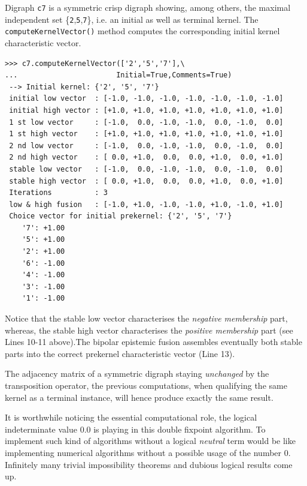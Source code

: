 Digraph \texttt{c7} is a symmetric crisp digraph showing, among others, the maximal independent set \{\texttt{2},\texttt{5},\texttt{7}\}, i.e. an initial as well as terminal kernel. The \texttt{computeKernelVector()} method computes the corresponding initial kernel characteristic vector.
\begin{lstlisting}[basicstyle=\ttfamily\scriptsize]
>>> c7.computeKernelVector(['2','5','7'],\
...                       Initial=True,Comments=True)
 --> Initial kernel: {'2', '5', '7'}
 initial low vector  : [-1.0, -1.0, -1.0, -1.0, -1.0, -1.0, -1.0]
 initial high vector : [+1.0, +1.0, +1.0, +1.0, +1.0, +1.0, +1.0]
 1 st low vector     : [-1.0,  0.0, -1.0, -1.0,  0.0, -1.0,  0.0]
 1 st high vector    : [+1.0, +1.0, +1.0, +1.0, +1.0, +1.0, +1.0]
 2 nd low vector     : [-1.0,  0.0, -1.0, -1.0,  0.0, -1.0,  0.0]
 2 nd high vector    : [ 0.0, +1.0,  0.0,  0.0, +1.0,  0.0, +1.0]
 stable low vector   : [-1.0,  0.0, -1.0, -1.0,  0.0, -1.0,  0.0]
 stable high vector  : [ 0.0, +1.0,  0.0,  0.0, +1.0,  0.0, +1.0]
 Iterations          : 3
 low & high fusion   : [-1.0, +1.0, -1.0, -1.0, +1.0, -1.0, +1.0]
 Choice vector for initial prekernel: {'2', '5', '7'}
    '7': +1.00
    '5': +1.00
    '2': +1.00
    '6': -1.00
    '4': -1.00
    '3': -1.00
    '1': -1.00
\end{lstlisting}

Notice that the stable low vector characterises the \emph{negative membership} part, whereas, the stable high vector characterises the \emph{positive membership} part (see Lines 10-11 above).The bipolar epistemic fusion assembles eventually both stable parts into the correct prekernel characteristic vector (Line 13). 

The adjacency matrix of a symmetric digraph staying \emph{unchanged} by the transposition operator, the previous computations, when qualifying the same kernel as a terminal instance, will hence produce exactly the same result.

It is worthwhile noticing the essential computational role, the logical indeterminate value $0.0$ is playing in this double fixpoint algorithm. To implement such kind of algorithms without a logical \emph{neutral} term would be like implementing numerical algorithms without a possible usage of the number $0$. Infinitely many trivial impossibility theorems and dubious logical results come up. 

{}
